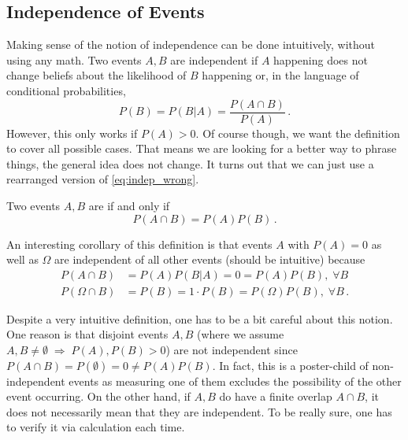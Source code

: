 	\subsection{Independence of Events}
Making sense of the notion of independence can be done intuitively, without using any math. Two events $A, B$ are independent if $A$ happening does not change beliefs about the likelihood of $B$ happening or, in the language of conditional probabilities,
\begin{equation}\label{eq:indep_wrong}
P(B) = P(B | A) = \frac{P(A \cap B)}{P(A)} \, .
\end{equation}
However, this only works if $P(A) > 0$. Of course though, we want the definition to cover all possible cases. That means we are looking for a better way to phrase things, the general idea does not change. It turns out that we can just use a rearranged version of \eqref{eq:indep_wrong}.
\begin{defi}
Two events $A, B$ are  if and only if
\begin{equation}
P(A \cap B) = P(A) P(B) \, .
\end{equation}
\end{defi}

An interesting corollary of this definition is that events $A$ with $P(A) = 0$ as well as $\Omega$ are independent of all other events (should be intuitive) because
\begin{align*}
P(A \cap B) &= P(A) P(B | A) = 0 = P(A) P(B), \; \forall B
\\
P(\Omega \cap B) &= P(B) = 1 \cdot P(B) = P(\Omega) P(B), \; \forall B \, .
\end{align*}


Despite a very intuitive definition, one has to be a bit careful about this notion. One reason is that disjoint events $A, B$ (where we assume $A, B \neq \emptyset\; \Rightarrow \; P(A), P(B) > 0$) are not independent since $P(A \cap B) = P(\emptyset) = 0 \neq P(A) P(B)$. In fact, this is a poster-child of non-independent events as measuring one of them excludes the possibility of the other event occurring. On the other hand, if $A, B$ do have a finite overlap $A \cap B$, it does not necessarily mean that they are independent. To be really sure, one has to verify it via calculation each time.

